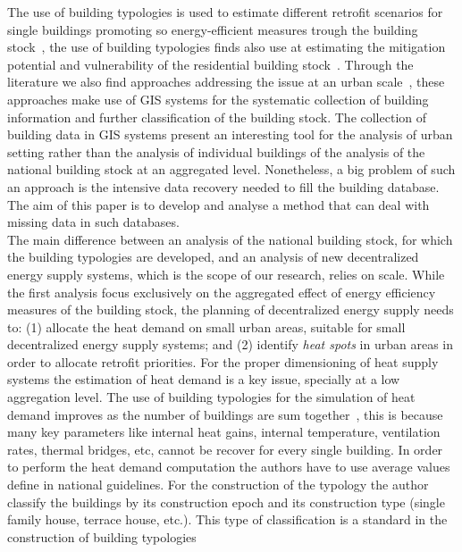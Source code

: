 \documentclass[authoryear,preprint,review,12pt]{elsarticle}
\begin{document}
\begin{linenumbers}
The use of building typologies is used to estimate different retrofit scenarios
for single buildings promoting so energy-efficient measures trough the building
stock~\cite{Kragh.2013, Singh.2013, Dascalaki.2011,
TABULAProjectTeam.2012}, the use of building typologies finds also use at
estimating the mitigation potential and vulnerability of the residential
building stock~\cite{Hrabovszky.2013}.  Through the literature we
also find approaches addressing the issue at an urban
scale~\cite{Caputo.2013}, these approaches make use of GIS systems for the
systematic collection of building information and further classification of the
building stock.  The collection of building data in GIS systems present an
interesting tool for the analysis of urban setting rather than the analysis of
individual buildings of the analysis of the national building stock at an
aggregated level. Nonetheless, a big problem of such an approach is the
intensive data recovery needed to fill the building database. The aim of this
paper is to develop and analyse a method that can deal with missing data in
such databases.\\

The main difference between an analysis of the national building stock, for
which the building typologies are developed, and an analysis of new decentralized
energy supply systems, which is the scope of our research, relies on scale.
While the first analysis focus exclusively on the aggregated effect of energy
efficiency measures of the building stock, the planning of decentralized energy
supply needs to:
(1) allocate the heat demand on small urban areas, suitable for small
decentralized energy supply systems; and
(2) identify \textit{heat spots} in urban areas in order to allocate retrofit
priorities.
For the proper dimensioning of heat supply systems the estimation of heat
demand is a key issue, specially at a low aggregation level.  The use of
building typologies for the simulation of heat demand improves as the number of
buildings are sum together~\cite{Blesl.2007}, this is because many key
parameters like internal heat gains, internal temperature, ventilation rates,
thermal bridges, etc, cannot be recover for every single building.  In order to
perform the heat demand computation the authors have to use average values
define in national guidelines.  For the construction of the typology the author
classify the buildings by its construction epoch and its construction type
(single family house, terrace house, etc.). This type of classification is a
standard in the construction of building typologies~\cite{Ebel.1990,
    ebokifeu.1996, ebokifeu.1998, ebok.2000, ebok.2005, Hildebrandt.2003,
    IWU.2003, Loga.2011, BSU.2011, Hermelink.2011, Kragh.2013,
    Singh.2013, Hrabovszky.2013, Caputo.2013}\\


\end{linenumbers}
\end{document}
